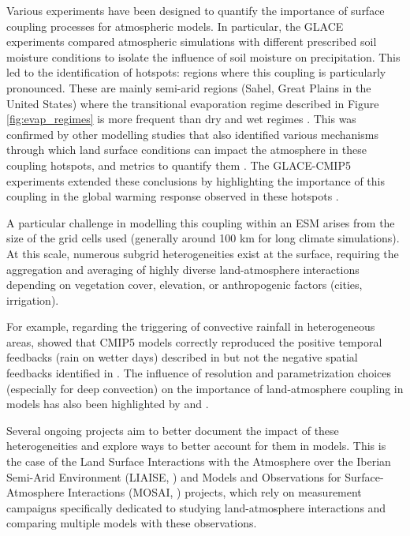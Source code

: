 Various experiments have been designed to quantify the importance of surface coupling processes for atmospheric models. In particular, the GLACE experiments \citep{koster_glace_2006} compared atmospheric simulations with different prescribed soil moisture conditions to isolate the influence of soil moisture on precipitation. This led to the identification of hotspots: regions where this coupling is particularly pronounced. These are mainly semi-arid regions (Sahel, Great Plains in the United States) where the transitional evaporation regime described in Figure \ref{fig:evap_regimes} is more frequent than dry and wet regimes \citep{koster_regions_2004}.
This was confirmed by other modelling studies that also identified various mechanisms through which land surface conditions can impact the atmosphere in these coupling hotspots, and metrics to quantify them \citep{dirmeyer_terrestrial_2011, zou_precipitation_2023}.
The GLACE-CMIP5 experiments \citep{seneviratne_impact_2013} extended these conclusions by highlighting the importance of this coupling in the global warming response observed in these hotspots \citep{berg_interannual_2015}.

A particular challenge in modelling this coupling within an ESM arises from the size of the grid cells used (generally around 100 km for long climate simulations). At this scale, numerous subgrid heterogeneities exist at the surface, requiring the aggregation and averaging of highly diverse land-atmosphere interactions depending on vegetation cover, elevation, or anthropogenic factors (cities, irrigation).

For example, regarding the triggering of convective rainfall in heterogeneous areas, \citet{moon_soil_2019} showed that CMIP5 models correctly reproduced the positive temporal feedbacks (rain on wetter days) described in \citet{guillod_reconciling_2015} but not the negative spatial feedbacks identified in \citet{taylor_afternoon_2012}. The influence of resolution and parametrization choices (especially for deep convection) on the importance of land-atmosphere coupling in models has also been highlighted by \citet{tuinenburg_high-resolution_2020} and \citet{lee_weaker_2024}.

Several ongoing projects aim to better document the impact of these heterogeneities and explore ways to better account for them in models. This is the case of the Land Surface Interactions with the Atmosphere over the Iberian Semi-Arid Environment (LIAISE, \cite{boone_land_2019}) and Models and Observations for Surface-Atmosphere Interactions (MOSAI, \cite{lohou_model_2022}) projects, which rely on measurement campaigns specifically dedicated to studying land-atmosphere interactions and comparing multiple models with these observations.

